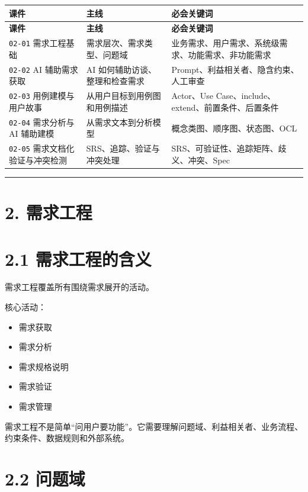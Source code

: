 \documentclass[UTF8,zihao=-4]{ctexart}
\begin{document}
{
\footnotesize
\begin{longtable}{|>{\raggedright\arraybackslash}p{}|>{\raggedright\arraybackslash}p{}|>{\raggedright\arraybackslash}p{}|}
\hline
\textbf{课件} & \textbf{主线} & \textbf{必会关键词} \\
\hline
\endfirsthead
\hline
\textbf{课件} & \textbf{主线} & \textbf{必会关键词} \\
\hline
\endhead
\texttt{02-01} 需求工程基础 & 需求层次、需求类型、问题域 & 业务需求、用户需求、系统级需求、功能需求、非功能需求 \\
\hline
\texttt{02-02} AI 辅助需求获取 & AI 如何辅助访谈、整理和检查需求 & Prompt、利益相关者、隐含约束、人工审查 \\
\hline
\texttt{02-03} 用例建模与用户故事 & 从用户目标到用例图和用例描述 & Actor、Use Case、include、extend、前置条件、后置条件 \\
\hline
\texttt{02-04} 需求分析与 AI 辅助建模 & 从需求文本到分析模型 & 概念类图、顺序图、状态图、OCL \\
\hline
\texttt{02-05} 需求文档化验证与冲突检测 & SRS、追踪、验证与冲突处理 & SRS、可验证性、追踪矩阵、歧义、冲突、Spec \\
\hline
\end{longtable}
}


\bigskip\hrule\bigskip

\section{2. 需求工程}

\section{2.1 需求工程的含义}

需求工程覆盖所有围绕需求展开的活动。

核心活动：

\begin{itemize}
\item 需求获取
\item 需求分析
\item 需求规格说明
\item 需求验证
\item 需求管理
\end{itemize}

需求工程不是简单“问用户要功能”。它需要理解问题域、利益相关者、业务流程、约束条件、数据规则和外部系统。

\section{2.2 问题域}
\end{document}
